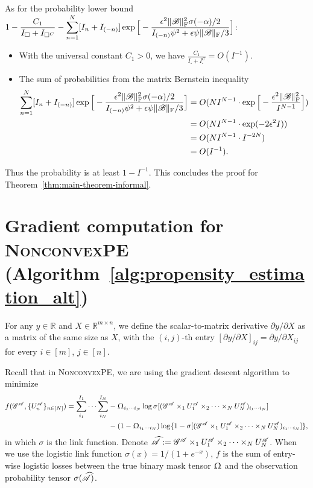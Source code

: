 \documentclass{article}
\newcommand{\T}[2][]{#1\mathscr{\MakeUppercase{#2}}}
\newcommand{\RR}{\mathbb{R}}
\newcommand{\norm}[1]{\Vert #1 \Vert}
\newcommand{\fnorm}[1]{\norm{#1}_{\mathrm{F}}}
\theoremstyle{plain}
\begin{document}
As for the probability lower bound $\displaystyle 1 - \frac{C_1}{I_\square + I_{\square^C}} - \sum_{n=1}^N [I_n + I_{(-n)}] \exp \Big[- \frac{\epsilon^2 \fnorm{\T{B}}^2 \sigma(- \alpha)/ 2}{I_{(-n)} \psi^2 + \epsilon \psi \fnorm{\T{B}}/3}\Big]$:
\begin{itemize}
	\item With the universal constant $C_1 > 0$, we have $\frac{C_1}{I_\square + I_\square^C} = O(I^{-1})$.
	\item The sum of probabilities from the matrix Bernstein inequality
	\begin{equation}
		\begin{aligned}
			\sum_{n=1}^N [I_n + I_{(-n)}] \exp \Big[- \frac{\epsilon^2 \fnorm{\T{B}}^2 \sigma(- \alpha)/ 2}{I_{(-n)} \psi^2 + \epsilon \psi \fnorm{\T{B}}/3}\Big] 
			& = O(N I^{N-1} \cdot \exp \Big[- \frac{\epsilon^2 \fnorm{\T{B}}^2}{I^{N-1}}\Big]) \\
			& = O(N I^{N-1} \cdot \exp(-2 \epsilon^2 I)) \\
			& = O(N I^{N-1} \cdot I^{-2 N}) \\
			& = O(I^{-1}).
		\end{aligned}
		\nonumber
	\end{equation}
\end{itemize}
Thus the probability is at least $1 - I^{-1}$.
This concludes the proof for Theorem~\ref{thm:main-theorem-informal}.

\section{Gradient computation for \textsc{NonconvexPE} (Algorithm~\ref{alg:propensity_estimation_alt})}
\label{sec:gradients}
For any $y \in \RR$ and $X \in \RR^{m \times n}$, we define the scalar-to-matrix derivative $\partial y / \partial X$ as a matrix of the same size as $X$, with the $(i, j)$-th entry $[\partial y / \partial X]_{ij} = \partial y / \partial X_{ij}$ for every $i \in [m]$, $j \in [n]$.

Recall that in \textsc{NonconvexPE}, we are using the gradient descent algorithm to minimize
\begin{equation}
	\begin{aligned}
		f (\T{G}^{\T{A}}, \{U_n^{\T{A}}\}_{n \in [N]}) = \sum_{i_1}^{I_1}  \cdots \sum_{i_N}^{I_N} & -\Upomega_{i_1 \cdots i_N} \log \sigma[(\T{G}^{\T{A}} \times_1 U_1^{\T{A}} \times_2 \cdots \times_N U_N^{\T{A}})_{i_1 \cdots i_N}] \\
		& -(1-\Upomega_{i_1 \cdots i_N})\log\{1-\sigma[(\T{G}^{\T{A}} \times_1 U_1^{\T{A}} \times_2 \cdots \times_N U_N^{\T{A}})_{i_1 \cdots i_N}]\},
	\end{aligned}
	\label{eq:objective-function-for-gd}
\end{equation}
in which $\sigma$ is the link function.
Denote $\widehat{\T{A}} := \T{G}^{\T{A}} \times_1 U_1^{\T{A}} \times_2 \cdots \times_N U_N^{\T{A}}$.
When we use the logistic link function $\sigma(x) = 1/(1 + e^{-x})$, $f$ is the sum of entry-wise logistic losses between the true binary mask tensor $\Upomega$ and the observation probability tensor $\sigma(\widehat{\T{A}})$.
\end{document}
